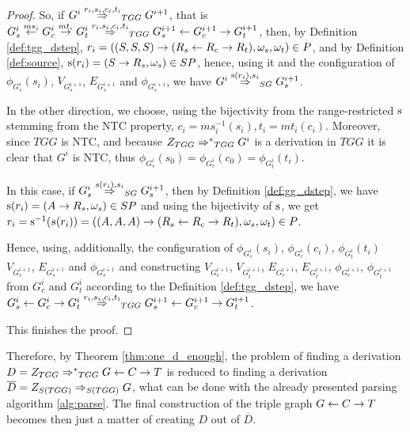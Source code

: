 \documentclass[]{report}
\begin{document}
\begin{proof}
	So, if $G^i \tderiv{r_{i}}{s_{i},c_{i},t_{i}}{TGG} G^{i+1}$, that is $G^i_s \ms{ms_i} G^i_c \mt{mt_i} G^i_t \tderiv{r_i}{s_i,c_i,t_i}{TGG} G^{i+1}_s \ms{} G^{i+1}_c \mt{} G^{i+1}_t$, then, by Definition \ref{def:tgg_dstep}, $r_i = ((S,S,S) \to (R_s \overset{}{\leftarrow} R_c \overset{}{\rightarrow} R_t), \omega_s, \omega_t) \in P$, and by Definition \ref{def:source}, $\operatorname{s}(r_i) = (S \to R_s, \omega_s) \in SP$, hence, using it and the configuration of $\phi_{G^i_s}(s_i)$, $V_{G^{i+1}_s}$, $E_{G^{i+1}_s}$ and $\phi_{G^{i+1}_s}$, we have $G^i \deriv{\source(r_i)}{s_i}{SG} G^{i+1}_s$.
	
	In the other direction, we choose, using the bijectivity from the range-restricted $\operatorname{s}$ stemming from the NTC property, $c_i = ms_i^{-1}(s_i), t_i = mt_i(c_i)$. Moreover, since $TGG$ is NTC, and because $\startTG{TGG} \tderivtr{}{}{TGG} G^i$ is a derivation in $TGG$ it is clear that $G^i$ is NTC, thus $\phi_{G^i_s}(s_0) = \phi_{G^i_c}(c_0) = \phi_{G^i_t}(t_i)$.
	
	In this case, if $G^{i}_s \deriv{s(r_i)}{s_i}{SG} G^{i+1}_s$, then by Definition \ref{def:gg_dstep}, we have $\operatorname{s}(r_i) = (A \to R_s, \omega_s) \in SP$ and using the bijectivity of $\operatorname{s}$, we get $r_i = \operatorname{s}^{-1}(s(r_i)) = ((A,A,A) \to (R_s \overset{}{\leftarrow} R_c \overset{}{\rightarrow} R_t), \omega_s, \omega_t) \in P$. 
	
	Hence, using, additionally, the configuration of $\phi_{G^i_s}(s_i)$, $\phi_{G^i_c}(c_i)$, $\phi_{G^i_t}(t_i)$ $V_{G^{i+1}_s}$, $E_{G^{i+1}_s}$ and $\phi_{G^{i+1}_s}$ and constructing $V_{G^{i+1}_c}$, $V_{G^{i+1}_t}$, $E_{G^{i+1}_c}$, $E_{G^{i+1}_t}$, $\phi_{G^{i+1}_c}$, $\phi_{G^{i+1}_t}$ from $G^i_c$ and $G^i_t$ according to the Definition \ref{def:tgg_dstep}, we have $ G^i_s \ms{} G^i_c \mt{} G^i_t \tderiv{r_i}{s_i,c_i,t_i}{TGG} G^{i+1}_s \ms{} G^{i+1}_c \mt{} G^{i+1}_t$.
	
	This finishes the proof.
	
\end{proof}

Therefore, by Theorem \ref{thm:one_d_enough}, the problem of finding a derivation $D = \startTG{TGG} \tderivtr{}{}{TGG} G \ms{} C \mt{} T$ is reduced to finding a derivation $\overline{D} = \startG{S(TGG)} \deriv{}{}{S(TGG)} G$, what can be done with the already presented parsing algorithm \ref{alg:parse}. The final construction of the triple graph $G \overset{}{\leftarrow} C \overset{}{\rightarrow} T$ becomes then just a matter of creating $D$ out of $\overline{D}$.

\end{document}
